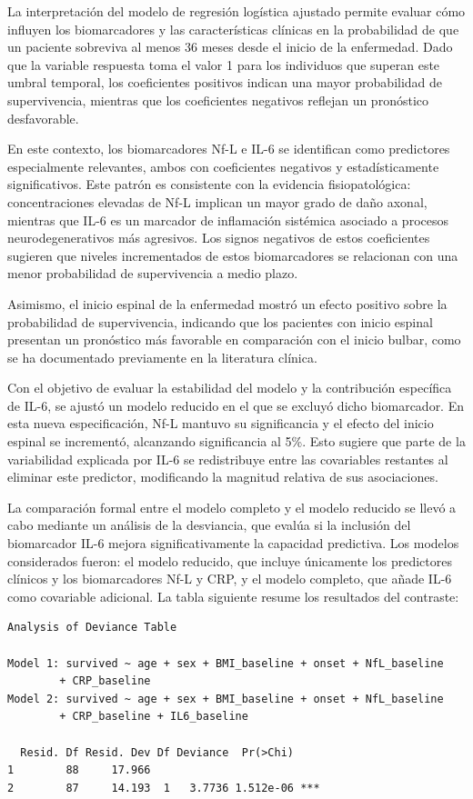 \documentclass[12pt]{article} %
\begin{document}
La interpretación del modelo de regresión logística ajustado permite evaluar cómo influyen los biomarcadores y las características clínicas en la probabilidad de que un paciente sobreviva al menos 36 meses desde el inicio de la enfermedad. Dado que la variable respuesta toma el valor 1 para los individuos que superan este umbral temporal, los coeficientes positivos indican una mayor probabilidad de supervivencia, mientras que los coeficientes negativos reflejan un pronóstico desfavorable.

En este contexto, los biomarcadores Nf-L e IL-6 se identifican como predictores especialmente relevantes, ambos con coeficientes negativos y estadísticamente significativos. Este patrón es consistente con la evidencia fisiopatológica: concentraciones elevadas de Nf-L implican un mayor grado de daño axonal, mientras que IL-6 es un marcador de inflamación sistémica asociado a procesos neurodegenerativos más agresivos. Los signos negativos de estos coeficientes sugieren que niveles incrementados de estos biomarcadores se relacionan con una menor probabilidad de supervivencia a medio plazo.

Asimismo, el inicio espinal de la enfermedad mostró un efecto positivo sobre la probabilidad de supervivencia, indicando que los pacientes con inicio espinal presentan un pronóstico más favorable en comparación con el inicio bulbar, como se ha documentado previamente en la literatura clínica.

Con el objetivo de evaluar la estabilidad del modelo y la contribución específica de IL-6, se ajustó un modelo reducido en el que se excluyó dicho biomarcador. En esta nueva especificación, Nf-L mantuvo su significancia y el efecto del inicio espinal se incrementó, alcanzando significancia al 5\%. Esto sugiere que parte de la variabilidad explicada por IL-6 se redistribuye entre las covariables restantes al eliminar este predictor, modificando la magnitud relativa de sus asociaciones.

La comparación formal entre el modelo completo y el modelo reducido se llevó a cabo mediante un análisis de la desviancia, que evalúa si la inclusión del biomarcador IL-6 mejora significativamente la capacidad predictiva. Los modelos considerados fueron: el modelo reducido, que incluye únicamente los predictores clínicos y los biomarcadores Nf-L y CRP, y el modelo completo, que añade IL-6 como covariable adicional. La tabla siguiente resume los resultados del contraste:

\begin{verbatim}
Analysis of Deviance Table

Model 1: survived ~ age + sex + BMI_baseline + onset + NfL_baseline 
        + CRP_baseline
Model 2: survived ~ age + sex + BMI_baseline + onset + NfL_baseline 
        + CRP_baseline + IL6_baseline

  Resid. Df Resid. Dev Df Deviance  Pr(>Chi)    
1        88     17.966                          
2        87     14.193  1   3.7736 1.512e-06 ***
\end{verbatim}
\end{document}
